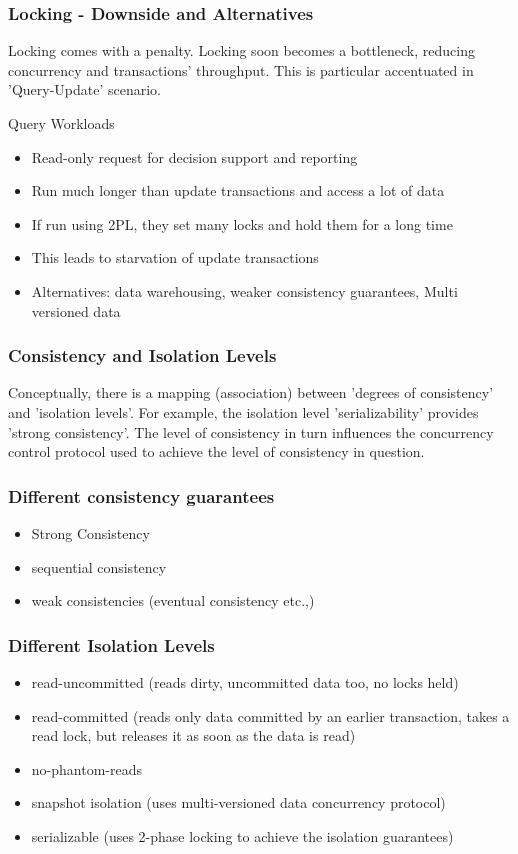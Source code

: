 \documentclass[12]{beamer}
\begin{document}
\begin{frame}
  \frametitle{Locking - Downside and Alternatives}
Locking comes with a penalty. Locking soon becomes a bottleneck, reducing concurrency and transactions' throughput. This is particular accentuated in 'Query-Update' scenario.
  \begin{block}{Query Workloads}
    \begin{itemize}
      \item Read-only request for decision support and reporting
      \item Run much longer than update transactions and access a lot of data
      \item If run using 2PL, they set many locks and hold them for a long time
      \item This leads to starvation of update transactions
      \item Alternatives: data warehousing, weaker consistency guarantees, Multi versioned data
    \end{itemize}
  \end{block}
\end{frame}

\begin{frame}
\frametitle{Consistency and Isolation Levels}
Conceptually, there is a mapping (association) between 'degrees of consistency' and 'isolation levels'. For example, the isolation level 'serializability' provides 'strong consistency'. The level of consistency in turn influences the concurrency control protocol used to achieve the level of consistency in question.
\end{frame}

\begin{frame}
\frametitle{Different consistency guarantees}
\begin{itemize}
\item Strong Consistency
\item sequential consistency
\item weak consistencies (eventual consistency etc.,)
\end{itemize}
\end{frame}

\begin{frame}
\frametitle{Different Isolation Levels}
\begin{itemize}
\item read-uncommitted (reads dirty, uncommitted data too, no locks held)
\item read-committed (reads only data committed by an earlier transaction, takes a read lock, but releases it as soon as the data is read)
\item no-phantom-reads
\item snapshot isolation (uses multi-versioned data concurrency protocol)
\item serializable (uses 2-phase locking to achieve the isolation guarantees)
\end{itemize}
\end{frame}
\end{document}
